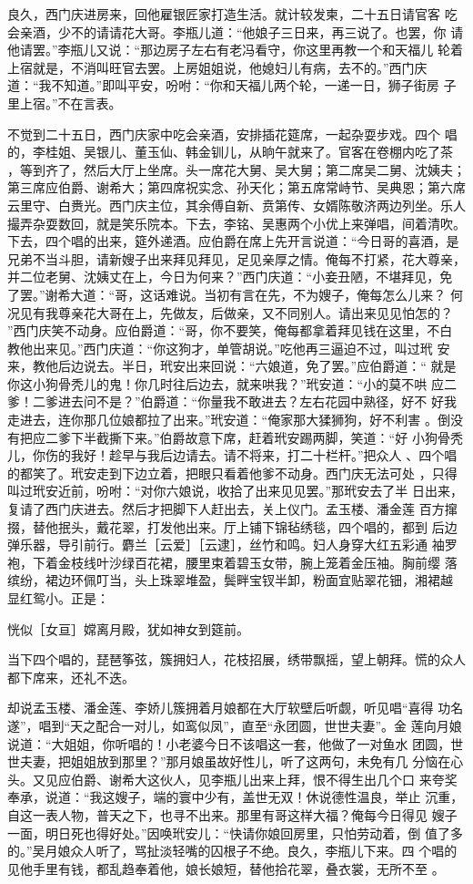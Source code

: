 良久，西门庆进房来，回他雇银匠家打造生活。就计较发柬，二十五日请官客
吃会亲酒，少不的请请花大哥。李瓶儿道：“他娘子三日来，再三说了。也罢，你
请他请罢。”李瓶儿又说：“那边房子左右有老冯看守，你这里再教一个和天福儿
轮着上宿就是，不消叫旺官去罢。上房姐姐说，他媳妇儿有病，去不的。”西门庆
道：“我不知道。”即叫平安，吩咐：“你和天福儿两个轮，一递一日，狮子街房
子里上宿。”不在言表。

不觉到二十五日，西门庆家中吃会亲酒，安排插花筵席，一起杂耍步戏。四个
唱的，李桂姐、吴银儿、董玉仙、韩金钏儿，从晌午就来了。官客在卷棚内吃了茶
，等到齐了，然后大厅上坐席。头一席花大舅、吴大舅；第二席吴二舅、沈姨夫；
第三席应伯爵、谢希大；第四席祝实念、孙天化；第五席常峙节、吴典恩；第六席
云里守、白赉光。西门庆主位，其余傅自新、贲第传、女婿陈敬济两边列坐。乐人
撮弄杂耍数回，就是笑乐院本。下去，李铭、吴惠两个小优上来弹唱，间着清吹。
下去，四个唱的出来，筵外递酒。应伯爵在席上先开言说道：“今日哥的喜酒，是
兄弟不当斗胆，请新嫂子出来拜见拜见，足见亲厚之情。俺每不打紧，花大尊亲，
并二位老舅、沈姨丈在上，今日为何来？”西门庆道：“小妾丑陋，不堪拜见，免
了罢。”谢希大道：“哥，这话难说。当初有言在先，不为嫂子，俺每怎么儿来？
何况见有我尊亲花大哥在上，先做友，后做亲，又不同别人。请出来见见怕怎的？
”西门庆笑不动身。应伯爵道：“哥，你不要笑，俺每都拿着拜见钱在这里，不白
教他出来见。”西门庆道：“你这狗才，单管胡说。”吃他再三逼迫不过，叫过玳
安来，教他后边说去。半日，玳安出来回说：“六娘道，免了罢。”应伯爵道：“
就是你这小狗骨秃儿的鬼！你几时往后边去，就来哄我？”玳安道：“小的莫不哄
应二爹！二爹进去问不是？”伯爵道：“你量我不敢进去？左右花园中熟径，好不
好我走进去，连你那几位娘都拉了出来。”玳安道：“俺家那大猱狮狗，好不利害
。倒没有把应二爹下半截撕下来。”伯爵故意下席，赶着玳安踢两脚，笑道：“好
小狗骨秃儿，你伤的我好！趁早与我后边请去。请不将来，打二十栏杆。”把众人
、四个唱的都笑了。玳安走到下边立着，把眼只看着他爹不动身。西门庆无法可处
，只得叫过玳安近前，吩咐：“对你六娘说，收拾了出来见见罢。”那玳安去了半
日出来，复请了西门庆进去。然后才把脚下人赶出去，关上仪门。孟玉楼、潘金莲
百方撺掇，替他抿头，戴花翠，打发他出来。厅上铺下锦毡绣毯，四个唱的，都到
后边弹乐器，导引前行。麝兰［云爱］［云逮］，丝竹和鸣。妇人身穿大红五彩通
袖罗袍，下着金枝线叶沙绿百花裙，腰里束着碧玉女带，腕上笼着金压袖。胸前缨
落缤纷，裙边环佩叮当，头上珠翠堆盈，鬓畔宝钗半卸，粉面宜贴翠花钿，湘裙越
显红鸳小。正是：

恍似［女亘］嫦离月殿，犹如神女到筵前。

当下四个唱的，琵琶筝弦，簇拥妇人，花枝招展，绣带飘摇，望上朝拜。慌的众人
都下席来，还礼不迭。

却说孟玉楼、潘金莲、李娇儿簇拥着月娘都在大厅软壁后听觑，听见唱“喜得
功名遂”，唱到“天之配合一对儿，如鸾似凤”，直至“永团圆，世世夫妻”。金
莲向月娘说道：“大姐姐，你听唱的！小老婆今日不该唱这一套，他做了一对鱼水
团圆，世世夫妻，把姐姐放到那里？”那月娘虽故好性儿，听了这两句，未免有几
分恼在心头。又见应伯爵、谢希大这伙人，见李瓶儿出来上拜，恨不得生出几个口
来夸奖奉承，说道：“我这嫂子，端的寰中少有，盖世无双！休说德性温良，举止
沉重，自这一表人物，普天之下，也寻不出来。那里有哥这样大福？俺每今日得见
嫂子一面，明日死也得好处。”因唤玳安儿：“快请你娘回房里，只怕劳动着，倒
值了多的。”吴月娘众人听了，骂扯淡轻嘴的囚根子不绝。良久，李瓶儿下来。四
个唱的见他手里有钱，都乱趋奉着他，娘长娘短，替他拾花翠，叠衣裳，无所不至
。

